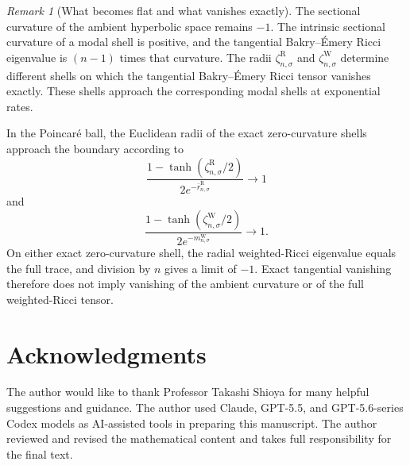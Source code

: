 \documentclass{amsart}
\numberwithin{equation}{section}
\theoremstyle{plain}
\theoremstyle{definition}
\theoremstyle{remark}
\newtheorem{rem}[thm]{Remark}
\begin{document}
\begin{rem}[What becomes flat and what vanishes exactly]
\label{rem:what-is-flat}
	The sectional curvature of the ambient hyperbolic space remains $-1$.
	The intrinsic sectional curvature of a modal shell is positive, and the
	tangential Bakry--\'Emery Ricci eigenvalue is $(n-1)$ times that
	curvature.  The radii $\zeta^{\mathrm R}_{n,\sigma}$ and
	$\zeta^{\mathrm W}_{n,\sigma}$ determine different shells on which the
	tangential Bakry--\'Emery Ricci tensor vanishes exactly.  These shells
	approach the corresponding modal shells at exponential rates.

	In the Poincar\'e ball, the Euclidean radii of the exact zero-curvature
	shells approach the boundary according to
	\[
		\frac{1-\tanh(\zeta^{\mathrm R}_{n,\sigma}/2)}
		{2e^{-\bar r^{\mathrm R}_{n,\sigma}}}
		\longrightarrow1
	\]
	and
	\[
		\frac{1-\tanh(\zeta^{\mathrm W}_{n,\sigma}/2)}
		{2e^{-m^{\mathrm W}_{n,\sigma}}}
		\longrightarrow1.
	\]
	On either exact zero-curvature shell, the radial weighted-Ricci
	eigenvalue equals the full trace, and division by $n$ gives a limit of
	$-1$.  Exact tangential vanishing therefore does not imply vanishing of
	the ambient curvature or of the full weighted-Ricci tensor.
\end{rem}

\section*{Acknowledgments}

The author would like to thank Professor Takashi Shioya for many helpful
suggestions and guidance.  The author used Claude, GPT-5.5, and GPT-5.6-series
Codex models as AI-assisted tools in preparing this manuscript.  The author
reviewed and revised the mathematical content and takes full responsibility
for the final text.
\end{document}
